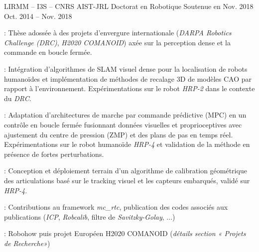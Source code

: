 \begin{cventries}
\cventry
    {LIRMM -- I3S -- CNRS AIST-JRL} %
    {Doctorat en Robotique} %
    {Soutenue en Nov. 2018} %
    {Oct. 2014 -- Nov. 2018} %
    {
      \begin{cvitems} %
        \item {} : Thèse adossée à des projets d'envergure internationale (\emph{DARPA Robotics Challenge (DRC)}, \emph{H2020 COMANOID}) axée sur la perception dense et la commande en boucle fermée.
        \item {} : Intégration d'algorithmes de SLAM visuel dense pour la localisation de robots humanoïdes et implémentation de méthodes de recalage 3D de modèles CAO par rapport à l'environnement. Expérimentations sur le robot \emph{HRP-2} dans le contexte du \emph{DRC}.
        \item {} : Adaptation d'architectures de marche par commande prédictive (MPC) en un contrôle en boucle fermée fusionnant données visuelles et proprioceptives avec ajustement du centre de pression (ZMP) et des plans de pas en temps réel. Expérimentations sur le robot humanoïde \emph{HRP-4} et validation de la méthode en présence de fortes perturbations.
        \item {} : Conception et déploiement terrain d'un algorithme de calibration géométrique des articulations basé sur le tracking visuel et les capteurs embarqués, validé sur \emph{HRP-4}.
        \item {} : Contributions au framework \emph{mc\_rtc}, publication des codes associés aux publications (\emph{ICP}, \emph{Robcalib}, filtre de \emph{Savitzky-Golay}, ...)
        \item {} : Robohow puis projet Européen H2020 COMANOID (\emph{détails section « Projets de Recherche»})
      \end{cvitems}
    }


\end{cventries}
